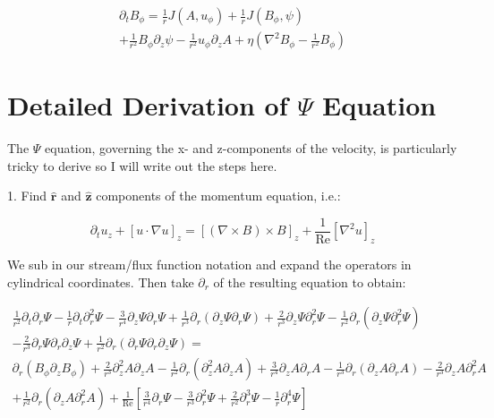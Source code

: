\documentclass{paper}
\newcommand{\beq}{\begin{equation}}
\newcommand{\eeq}{\end{equation}}
\newcommand{\uphi}{\ensuremath{u_\phi}}
\newcommand{\rhat}{\ensuremath{\mathbf{\hat{r}}}}
\newcommand{\zhat}{\ensuremath{\mathbf{\hat{z}}}}
\newcommand\reye{\mathrm{Re}}
\begin{document}
\begin{multline}
  \label{eq:By} %
\partial_t B_\phi = \frac{1}{r} J(A, \uphi) + \frac{1}{r} J(B_\phi, \psi)\\
+ \frac{1}{r^2} B_\phi \partial_z \psi - \frac{1}{r^2} \uphi \partial_z A + \eta \left(\nabla^2 B_\phi - \frac{1}{r^2} B_\phi \right)
\end{multline}

\section{Detailed Derivation of $\Psi$ Equation}
The $\Psi$ equation, governing the x- and z-components of the velocity, is particularly tricky to derive so I will write out the steps here.

1. Find $\rhat$ and $\zhat$ components of the momentum equation, i.e.:

\beq
\partial_t u_z + \left[u \cdot \nabla u \right]_z = \left[ \left( \nabla \times B \right) \times B \right]_z + \frac{1}{\reye}\left[ \nabla^2 u \right] _z
\eeq

We sub in our stream/flux function notation and expand the operators in cylindrical coordinates. Then take $\partial_r$ of the resulting equation to obtain:

\begin{multline}
\frac{1}{r^2} \partial_t \partial_r \Psi - \frac{1}{r} \partial_t \partial_r^2 \Psi - \frac{3}{r^4}\partial_z \Psi \partial_r \Psi + \frac{1}{r^3} \partial_r \left( \partial_z \Psi \partial_r \Psi \right) + \frac{2}{r^3} \partial_z \Psi \partial_r^2 \Psi - \frac{1}{r^2} \partial_r \left(\partial_z \Psi \partial_r^2 \Psi \right)\\
- \frac{2}{r^3} \partial_r \Psi \partial_r\partial_z \Psi + \frac{1}{r^2} \partial_r \left(\partial_r \Psi \partial_r \partial_z \Psi\right) = \\
\partial_r\left(B_\phi \partial_z B_\phi\right) + \frac{2}{r^3} \partial_z^2 A \partial_z A - \frac{1}{r^2} \partial_r \left(\partial_z^2 A \partial_z A\right) + \frac{3}{r^4} \partial_z A \partial_r A - \frac{1}{r^3} \partial_r \left(\partial_z A \partial_r A \right) - \frac{2}{r^3} \partial_z A \partial_r^2 A \\
+ \frac{1}{r^2} \partial_r \left(\partial_z A \partial_r^2 A \right) 
+ \frac{1}{\reye} \left[\frac{3}{r^4} \partial_r \Psi - \frac{3}{r^3} \partial_r^2 \Psi + \frac{2}{r^2} \partial_r^3 \Psi - \frac{1}{r} \partial_r^4 \Psi\right]
\end{multline}
\end{document}
